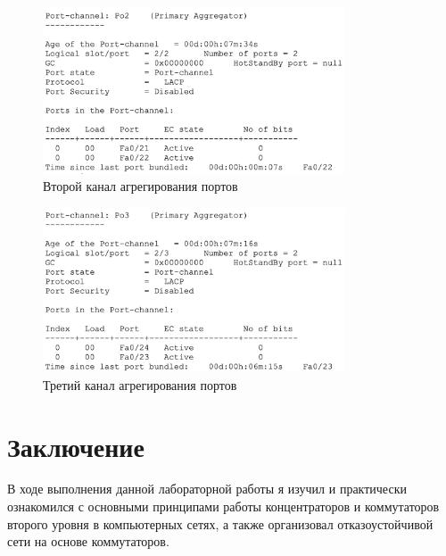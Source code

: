 \documentclass[a4paper, 14pt]{extarticle}
\begin{document}
\begin{figure}[H]
  \centering
  \includegraphics[width=0.8\textwidth]{images/lacp/channel-2.png}
  \caption{Второй канал агрегирования портов}
  \label{fig:lacp-channel-2}
\end{figure}

\begin{figure}[H]
  \centering
  \includegraphics[width=0.8\textwidth]{images/lacp/channel-3.png}
  \caption{Третий канал агрегирования портов}
  \label{fig:lacp-channel-3}
\end{figure}

\section{Заключение}

В ходе выполнения данной лабораторной работы я изучил и практически ознакомился
с основными принципами работы концентраторов и коммутаторов второго уровня в
компьютерных сетях, а также организовал отказоустойчивой сети на основе
коммутаторов.
\end{document}
